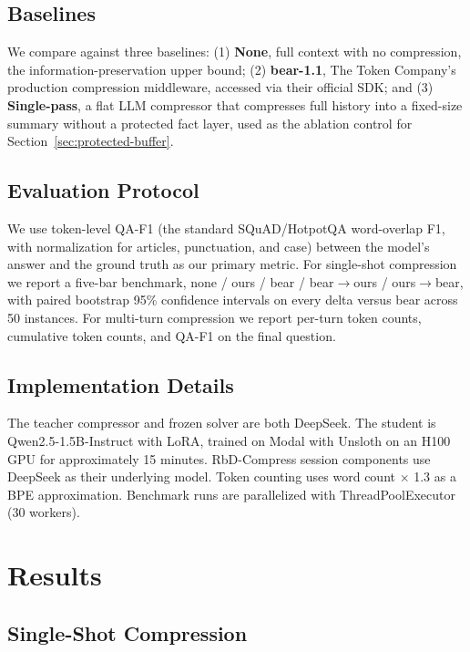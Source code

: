 \documentclass{article}
\begin{document}
\subsection{Baselines}
We compare against three baselines: (1) \textbf{None}, full context with
no compression, the information-preservation upper bound; (2)
\textbf{bear-1.1}, The Token Company's production compression middleware,
accessed via their official SDK; and (3) \textbf{Single-pass}, a flat
LLM compressor that compresses full history into a fixed-size summary
without a protected fact layer, used as the ablation control for
Section~\ref{sec:protected-buffer}.

\subsection{Evaluation Protocol}
We use token-level QA-F1 (the standard SQuAD/HotpotQA word-overlap F1, with
normalization for articles, punctuation, and case) between the model's answer
and the ground truth as our primary metric. For single-shot compression we report a five-bar benchmark,
none / ours / bear / bear$\rightarrow$ours / ours$\rightarrow$bear, with
paired bootstrap 95\% confidence intervals on every delta versus bear
across 50 instances. For multi-turn compression we report per-turn token
counts, cumulative token counts, and QA-F1 on the final question.

\subsection{Implementation Details}
The teacher compressor and frozen solver are both DeepSeek. The student
is Qwen2.5-1.5B-Instruct with LoRA, trained on Modal with Unsloth on an
H100 GPU for approximately 15 minutes. RbD-Compress session components
use DeepSeek as their underlying model. Token counting uses word count
$\times$ 1.3 as a BPE approximation. Benchmark runs are parallelized
with ThreadPoolExecutor (30 workers).


\section{Results}

\subsection{Single-Shot Compression}
\end{document}
